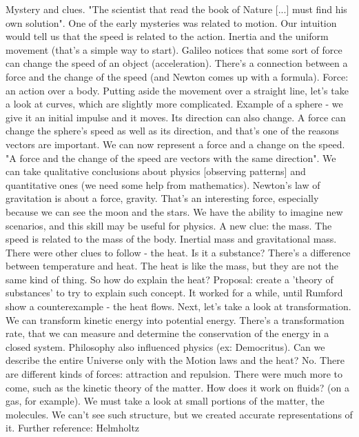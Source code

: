 \documentclass{cornell}
\begin{document}
%
{Mystery and clues. "The scientist that read the book of Nature [...] must find his own solution". One of the early mysteries was related to motion. Our intuition would tell us that the speed is related to the action. Inertia and the uniform movement (that's a simple way to start). Galileo notices that some sort of force can change the speed of an object (acceleration). There's a connection between a force and the change of the speed (and Newton comes up with a formula). Force: an action over a body. Putting aside the movement over a straight line, let's take a look at curves, which are slightly more complicated. Example of a sphere - we give it an initial impulse and it moves. Its direction can also change. A force can change the sphere's speed as well as its direction, and that's one of the reasons vectors are important. We can now represent a force and a change on the speed. "A force and the change of the speed are vectors with the same direction". We can take qualitative conclusions about physics [observing patterns] and quantitative ones (we need some help from mathematics). Newton's law of gravitation is about a force, gravity. That's an interesting force, especially because we can see the moon and the stars. }%
{We have the ability to imagine new scenarios, and this skill may be useful for physics. A new clue: the mass. The speed is related to the mass of the body. Inertial mass and gravitational mass. There were other clues to follow - the heat. Is it a substance? There's a difference between temperature and heat. The heat is like the mass, but they are not the same kind of thing. So how do explain the heat? Proposal: create a 'theory of substances' to try to explain such concept. It worked for a while, until Rumford show a counterexample - the heat flows. Next, let's take a look at transformation. We can transform kinetic energy into potential energy. There's a transformation rate, that we can measure and determine the conservation of the energy in a closed system. Philosophy also influenced physics (ex: Democritus). Can we describe the entire Universe only with the Motion laws and the heat? No. There are different kinds of forces: attraction and repulsion. There were much more to come, such as the kinetic theory of the matter. How does it work on fluids? (on a gas, for example). We must take a look at small portions of the matter, the molecules. We can't see such structure, but we created accurate representations of it. }%
{Further reference: Helmholtz}%
\end{document}
